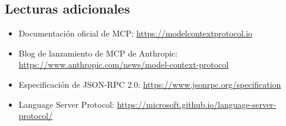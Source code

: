 \documentclass[a4paper]{article}
\begin{document}
\subsection{Lecturas adicionales}

\begin{itemize}
    \item Documentación oficial de MCP: \url{https://modelcontextprotocol.io}
    \item Blog de lanzamiento de MCP de Anthropic: \url{https://www.anthropic.com/news/model-context-protocol}
    \item Especificación de JSON-RPC 2.0: \url{https://www.jsonrpc.org/specification}
    \item Language Server Protocol: \url{https://microsoft.github.io/language-server-protocol/}
\end{itemize}

\end{document}

